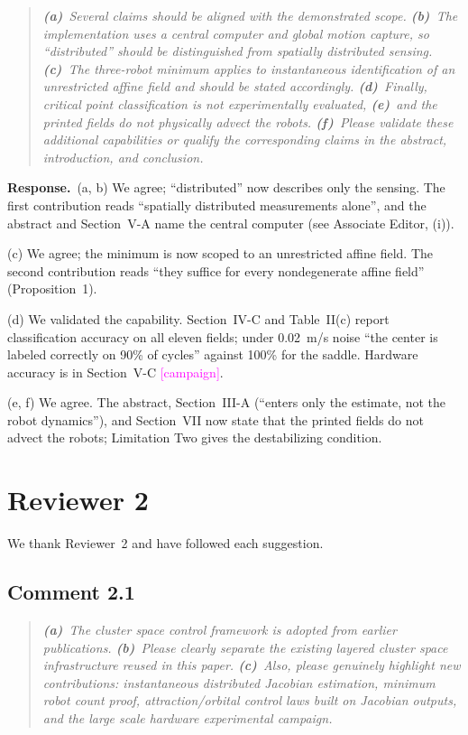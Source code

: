 \documentclass[10pt]{article}
\newcommand{\rev}[1]{#1}                             %
\newcommand{\open}[1]{\textcolor{magenta}{[#1]}}     %
\newcommand{\resp}{\par\textbf{Response.}~}
\begin{document}
\begin{quote}\itshape
\textbf{(a)}~Several claims should be aligned with the demonstrated scope.
\textbf{(b)}~The implementation uses a central computer and global motion capture, so ``distributed'' should be distinguished from spatially distributed sensing.
\textbf{(c)}~The three-robot minimum applies to instantaneous identification of an unrestricted affine field and should be stated accordingly.
\textbf{(d)}~Finally, critical point classification is not experimentally evaluated,
\textbf{(e)}~and the printed fields do not physically advect the robots.
\textbf{(f)}~Please validate these additional capabilities or qualify the corresponding claims in the abstract, introduction, and conclusion.
\end{quote}

\resp (a, b) We agree; ``distributed'' now describes only the sensing. The first contribution reads ``spatially distributed measurements alone'', and the abstract and Section~V-A name the central computer (see Associate Editor, (i)).

(c) We agree; the minimum is now scoped to an unrestricted affine field. The second contribution reads ``they suffice for every nondegenerate affine field'' (Proposition~1).

(d) We validated the capability. Section~IV-C and Table~II(c) report classification accuracy on all eleven fields; under 0.02~m/s noise ``the center is labeled correctly on \rev{90}\% of cycles'' against \rev{100}\% for the saddle. Hardware accuracy is in Section~V-C \open{campaign}.

(e, f) We agree. The abstract, Section~III-A (``enters only the estimate, not the robot dynamics''), and Section~VII now state that the printed fields do not advect the robots; Limitation Two gives the destabilizing condition.

\section*{Reviewer 2}

We thank Reviewer~2 and have followed each suggestion.

\subsection*{Comment 2.1}

\begin{quote}\itshape
\textbf{(a)}~The cluster space control framework is adopted from earlier publications.
\textbf{(b)}~Please clearly separate the existing layered cluster space infrastructure reused in this paper.
\textbf{(c)}~Also, please genuinely highlight new contributions: instantaneous distributed Jacobian estimation, minimum robot count proof, attraction/orbital control laws built on Jacobian outputs, and the large scale hardware experimental campaign.
\end{quote}
\end{document}
